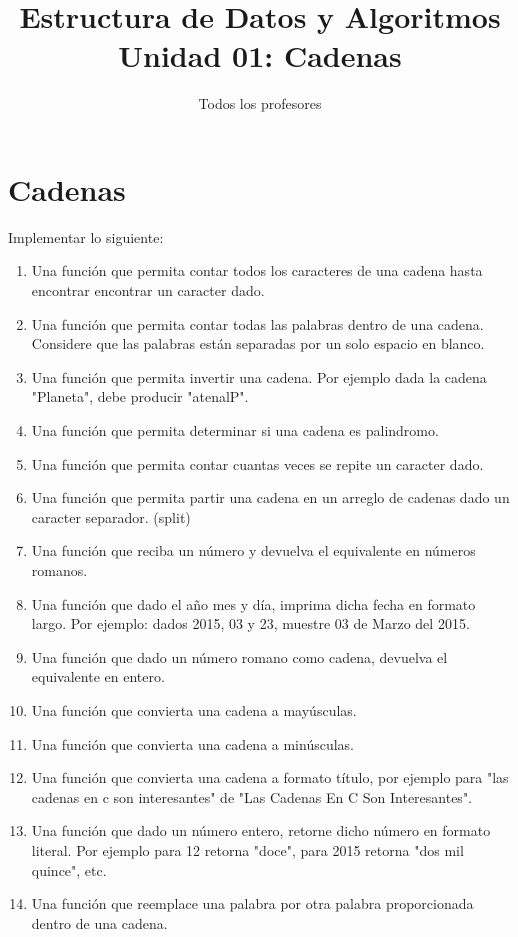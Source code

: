 \documentclass[a4paper]{article}
\title{Estructura de Datos y Algoritmos \\
  \large Unidad 01: Cadenas}
\author{Todos los profesores}
\begin{document}
\maketitle

\section{Cadenas}
Implementar lo siguiente:
\begin{enumerate}
  \item Una función que permita contar todos los caracteres de una cadena hasta
    encontrar encontrar un caracter dado.
  \item Una función que permita contar todas las palabras dentro de una cadena.
    Considere que las palabras están separadas por un solo espacio en blanco.
  \item Una función que permita invertir una cadena. Por ejemplo dada la cadena
    "Planeta", debe producir "atenalP".
  \item Una función que permita determinar si una cadena es palindromo.
  \item Una función que permita contar cuantas veces se repite un caracter dado.
  \item Una función que permita partir una cadena en un arreglo de cadenas dado
    un caracter separador. (split)
  \item Una función que reciba un número y devuelva el equivalente en números
    romanos.
  \item Una función que dado el año mes y día, imprima dicha fecha en formato
    largo. Por ejemplo: dados 2015, 03 y 23, muestre 03 de Marzo del 2015.
  \item Una función que dado un número romano como cadena, devuelva el
    equivalente en entero.
  \item Una función que convierta una cadena a mayúsculas.
  \item Una función que convierta una cadena a minúsculas.
  \item Una función que convierta una cadena a formato título, por ejemplo para
    "las cadenas en c son interesantes" de "Las Cadenas En C Son Interesantes".
  \item Una función que dado un número entero, retorne dicho número en formato
    literal. Por ejemplo para 12 retorna "doce", para 2015 retorna "dos mil
    quince", etc.
  \item Una función que reemplace una palabra por otra palabra proporcionada
    dentro de una cadena.
\end{enumerate}
\end{document}
